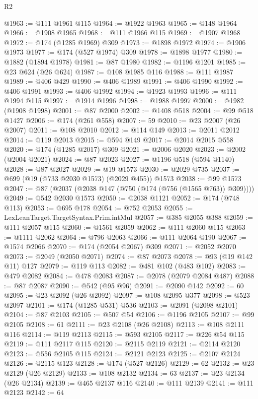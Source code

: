 \begin{lexlean}{R2}
\begin{coremodule}
@1963 := @111 @1961 @115
@1964 := @1922 @1963
@1965 := @148 @1964
@1966 := @1908 @1965
@1968 := @111 @1966 @115
@1969 := @1907 @1968
@1972 := @174 (@1285 @1969) @309
@1973 := @1898 @1972
@1974 := @1906 @1973
@1977 := @174 (@527 @1974) @309
@1978 := @1898 @1977
@1980 := @1882 (@1894 @1978)
@1981 := @87 @1980
@1982 := @1196 @1201
@1985 := @23 @624 (@26 @624)
@1987 := @108 @1985 @116
@1988 := @111 @1987
@1989 := @406 @429
@1990 := @406 @1989
@1991 := @406 @1990
@1992 := @406 @1991
@1993 := @406 @1992
@1994 := @1923 @1993
@1996 := @111 @1994 @115
@1997 := @1914 @1996
@1998 := @1988 @1997
@2000 := @1982 (@1908 @1998)
@2001 := @87 @2000
@2002 := @1408 @518
@2004 := @99 @518 @1427
@2006 := @174 (@261 @558)
@2007 := 59
@2010 := @23 @2007 (@26 @2007)
@2011 := @108 @2010
@2012 := @114 @149
@2013 := @2011 @2012
@2014 := @119 @2013
@2015 := @594 @149
@2017 := @2014 @2015 @558
@2020 := @174 (@1285 @2017) @309
@2021 := @2006 @2020
@2023 := @2002 (@2004 @2021)
@2024 := @87 @2023
@2027 := @1196 @518 (@594 @1140)
@2028 := @87 @2027
@2029 := @19 @1573
@2030 := @2029 @735
@2037 := @699 (@19 (@733 @2030 @1573) (@2029 @455)) @1573
@2038 := @99 @1573
@2047 := @87 (@2037 (@2038 @147 (@750 (@174 (@756 (@1565 @763)) @309))))
@2049 := @542 @2030 @1573
@2050 := @2038 @1121
@2052 := @174 (@748 @113)
@2053 := @695 @178
@2054 := @752 @2053
@2055 := LexLeanTarget.TargetSyntax.Prim.intMul
@2057 := @385 @2055 @388
@2059 := @111 @2057 @115
@2060 := @1561 @2059
@2062 := @111 @2060 @115
@2063 := @1111 @2062
@2064 := @796 @2063
@2066 := @111 @2064 @190
@2067 := @1574 @2066
@2070 := @174 (@2054 @2067) @309
@2071 := @2052 @2070
@2073 := @2049 (@2050 @2071)
@2074 := @87 @2073
@2078 := @93 (@19 @142 @11) @127
@2079 := @119 @113
@2082 := @481 @102 (@483 @102)
@2083 := @479 @2082
@2084 := @478 @2083
@2087 := @2078 (@2079 @2084 @487)
@2088 := @87 @2087
@2090 := @542 (@95 @96)
@2091 := @2090 @142
@2092 := 60
@2095 := @23 @2092 (@26 @2092)
@2097 := @108 @2095 @377
@2098 := @523 @2097
@2101 := @174 (@1285 @531) @536
@2103 := @2091 (@2098 @2101)
@2104 := @87 @2103
@2105 := @507 @54
@2106 := @1196 @2105
@2107 := @99 @2105
@2108 := 61
@2111 := @23 @2108 (@26 @2108)
@2113 := @108 @2111 @116
@2114 := @119 @2113
@2115 := @593 @2105
@2117 := @226 @54 @115
@2119 := @111 @2117 @115
@2120 := @2115 @2119
@2121 := @2114 @2120
@2123 := @556 @2105 @115
@2124 := @2121 @2123
@2125 := @2107 @2124
@2126 := @2115 @123
@2128 := @174 (@527 @2126)
@2129 := 62
@2132 := @23 @2129 (@26 @2129)
@2133 := @108 @2132
@2134 := 63
@2137 := @23 @2134 (@26 @2134)
@2139 := @465 @2137 @116
@2140 := @111 @2139
@2141 := @111 @2123
@2142 := 64

\end{coremodule}
\end{lexlean}
